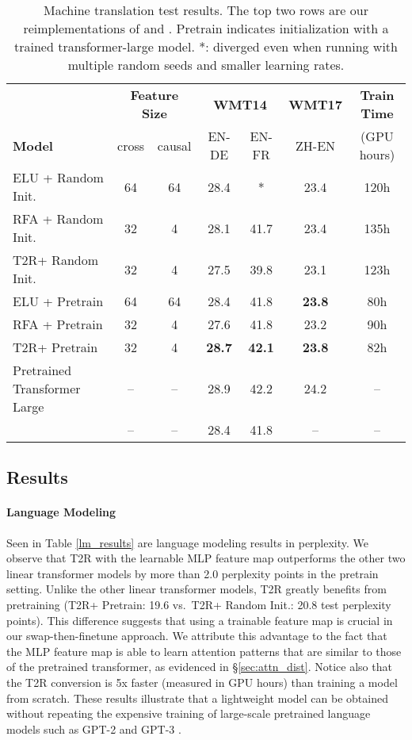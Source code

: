 \documentclass[11pt,a4paper]{article}
\newcommand{\TRNN}{T2R\xspace}
\begin{document}
\begin{table*}[h]
\centering
\addtolength{\tabcolsep}{-0.0pt}  
\begin{tabular}{@{} lcccccc @{}}
\toprule
&  \multicolumn{2}{c}{\textbf{Feature Size }} &  
\multicolumn{2}{c}{\textbf{WMT14}} &  \textbf{WMT17} & \textbf{Train Time}\\ 
\cmidrule(lr){2-3} \cmidrule(lr){4-5}  \cmidrule(lr){6-6}
\textbf{Model} & cross & causal  & EN-DE & EN-FR & ZH-EN & (GPU hours)\\
 \hline
ELU + Random Init.\ & 64 & 64 & 28.4 & * & 23.4 & 120h \\
RFA + Random Init.\ & 32 & 4 & 28.1 & 41.7& 23.4 &135h\\
\TRNN + Random Init.\ &32 &  4 & 27.5 & 39.8 & 23.1 & 123h\\

\hdashline
ELU + Pretrain & 64 & 64 & 28.4&41.8 & \textbf{23.8} & 80h\\
RFA + Pretrain & 32 & 4 & 27.6 & 41.8 &23.2 & 90h \\
\TRNN + Pretrain & 32 & 4& \textbf{28.7} &\textbf{42.1} & \textbf{23.8} & 82h\\
\hline
Pretrained Transformer Large & -- & --& 28.9 & 42.2 & 24.2  & --\\
\citet{Vaswani2017AttentionIA} & -- &-- &  28.4 & 41.8 & -- & -- \\
\bottomrule
\end{tabular}
\caption{Machine translation test results. The top two rows are our reimplementations of \citet{katharopoulos-et-al-2020} and \citet{RFA}. Pretrain indicates initialization with a trained transformer-large model.
*: diverged even when running with multiple random seeds and smaller learning rates.}
\label{mt_results}
\end{table*}
\subsection{Results}
\label{sec:results}
\paragraph{Language Modeling}
Seen in Table \ref{lm_results} are language modeling results in perplexity.
We observe that \TRNN with the learnable MLP feature map outperforms the other two linear transformer models by more than 2.0 perplexity points in the pretrain setting.
Unlike the other linear transformer models, \TRNN greatly benefits from pretraining (\TRNN + Pretrain: 19.6 vs.\ \TRNN + Random Init.: 20.8 test perplexity points).
This difference suggests that using a trainable feature map is crucial in our swap-then-finetune approach.
We attribute this advantage to the fact that the MLP feature map is able to learn attention patterns that are similar to those of the pretrained transformer,
as evidenced in \S\ref{sec:attn_dist}.
Notice also that the \TRNN conversion is 5x faster (measured in GPU hours) than training a model from scratch.
These results illustrate that a lightweight model can be obtained without repeating the expensive training of large-scale pretrained language models such as GPT-2 and GPT-3 \cite{gpt2, gpt3}.
\end{document}

